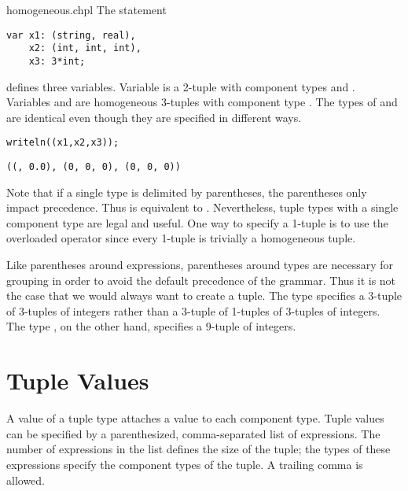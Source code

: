 \begin{chapelexample}{homogeneous.chpl}
The statement
\begin{chapel}
\begin{verbatim}
var x1: (string, real),
    x2: (int, int, int),
    x3: 3*int;
\end{verbatim}
\end{chapel}
defines three variables.  Variable  is a 2-tuple with
component types  and .  Variables 
and  are homogeneous 3-tuples with component type .
The types of  and  are identical even though they
are specified in different ways.
\begin{chapelpost}
\begin{verbatim}
writeln((x1,x2,x3));
\end{verbatim}
\end{chapelpost}
\begin{chapeloutput}
\begin{verbatim}
((, 0.0), (0, 0, 0), (0, 0, 0))
\end{verbatim}
\end{chapeloutput}
\end{chapelexample}

Note that if a single type is delimited by parentheses, the
parentheses only impact precedence.  Thus  is equivalent
to .  Nevertheless, tuple types with a single component type
are legal and useful.  One way to specify a 1-tuple is to use the
overloaded \chpl{*} operator since every 1-tuple is trivially a
homogeneous tuple.

\begin{rationale}
Like parentheses around expressions, parentheses around types are
necessary for grouping in order to avoid the default precedence of the
grammar.  Thus it is not the case that we would always want to create
a tuple.  The type  specifies a 3-tuple of 3-tuples of
integers rather than a 3-tuple of 1-tuples of 3-tuples of integers.
The type , on the other hand, specifies a 9-tuple of
integers.
\end{rationale}

\section{Tuple Values}
\label{Tuple_Values}

A value of a tuple type attaches a value to each component type.
Tuple values can be specified by a parenthesized, comma-separated list
of expressions.  The number of expressions in the list defines the
size of the tuple; the types of these expressions specify the
component types of the tuple. A trailing comma is allowed.

